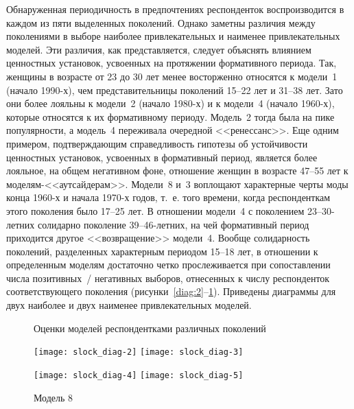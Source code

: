   Обнаруженная периодичность в предпочтениях респонденток воспроизводится в
  каждом из пяти выделенных поколений. Однако заметны различия между
  поколениями в выборе наиболее привлекательных и наименее привлекательных
  моделей. Эти различия, как представляется, следует объяснять влиянием
  ценностных установок, усвоенных на протяжении формативного периода. Так,
  женщины в возрасте от 23 до 30 лет менее восторженно относятся к модели~1
  (начало 1990-х), чем представительницы поколений 15--22 лет и 31--38 лет.
  Зато они более лояльны к модели~2 (начало 1980-х) и к модели~4 (начало
  1960-х), которые относятся к их формативному периоду. Модель~2 тогда была на
  пике популярности, а модель~4 переживала очередной <<ренессанс>>. Еще одним
  примером, подтверждающим справедливость гипотезы об устойчивости ценностных
  установок, усвоенных в формативный период, является более лояльное, на общем
  негативном фоне, отношение женщин в возрасте 47--55 лет к
  моделям-<<аутсайдерам>>. Модели~8 и~3 воплощают характерные черты моды конца
  1960-х и начала 1970-х годов, т.~е. того времени, когда респонденткам этого
  поколения было 17--25 лет. В отношении модели~4 с поколением 23--30-летних
  солидарно поколение 39--46-летних, на чей формативный период приходится
  другое <<возвращение>> модели~4. Вообще солидарность поколений, разделенных
  характерным периодом 15--18 лет, в отношении к определенным моделям
  достаточно четко прослеживается при сопоставлении числа позитивных~/
  негативных выборов, отнесенных к числу респонденток соответствующего
  поколения (рисунки~\ref{diag:2}--\ref{diag:5}). Приведены диаграммы для
  двух наиболее и двух наименее привлекательных моделей.~\cite{bib:2}

  \begin{figure}[t!]
    \center
    Оценки моделей респондентками различных поколений
    \bigskip
    
    \texttt{[image: slock\_diag-2]} \hfill
    \texttt{[image: slock\_diag-3]} \\
    \parbox{.495\textwidth}{\caption{Модель 1} \label{diag:2}} \hfill
    \parbox{.495\textwidth}{\caption{Модель 3} \label{diag:3}}
    
    \bigskip
    \bigskip
    
    \texttt{[image: slock\_diag-4]} \hfill
    \texttt{[image: slock\_diag-5]} \\
    \parbox{.495\textwidth}{\caption{Модель 4} \label{diag:4}} \hfill
    \parbox{.495\textwidth}{\caption{Модель 8} \label{diag:5}}
  \end{figure}

